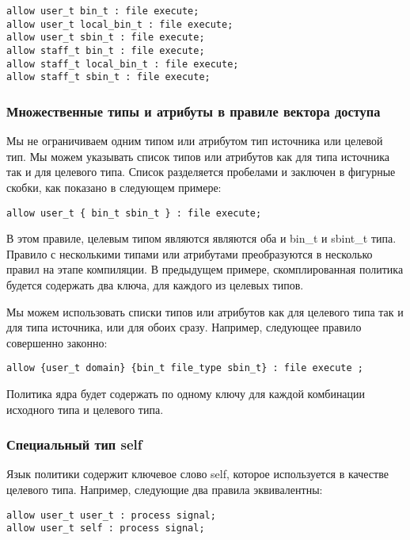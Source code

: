 \documentclass{./../class/UIR}
\begin{document}
\begin{verbatim}
allow user_t bin_t : file execute;
allow user_t local_bin_t : file execute;
allow user_t sbin_t : file execute;
allow staff_t bin_t : file execute;
allow staff_t local_bin_t : file execute;
allow staff_t sbin_t : file execute;
\end{verbatim}

\subsubsection{Множественные типы и атрибуты в правиле вектора доступа}

Мы не ограничиваем одним типом или атрибутом тип источника или целевой тип. Мы можем указывать список типов или атрибутов как для типа источника так и для целевого типа. Список разделяется пробелами и заключен в фигурные скобки, как показано в следующем примере:

\begin{verbatim}
allow user_t { bin_t sbin_t } : file execute;
\end{verbatim}

В этом правиле, целевым типом являются являются оба и bin\_t и sbint\_t типа.
Правило с несколькими типами или атрибутами преобразуются в несколько правил на
этапе компиляции. В предыдущем примере, скомплированная политика будется
содержать два ключа, для каждого из целевых типов.

Мы можем использовать списки типов или атрибутов как для целевого типа так и для
типа источника, или для обоих сразу. Например, следующее правило совершенно
законно:

\begin{verbatim}
allow {user_t domain} {bin_t file_type sbin_t} : file execute ;
\end{verbatim}

Политика ядра будет содержать по одному ключу для каждой комбинации исходного
типа и целевого типа.

\subsubsection{Специальный тип self}

Язык политики содержит ключевое слово self, которое используется в качестве
целевого типа. Например, следующие два правила эквивалентны:

\begin{verbatim}
allow user_t user_t : process signal;
allow user_t self : process signal;
\end{verbatim}
\end{document}
